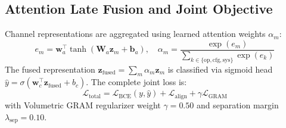 \documentclass[pdflatex,sn-mathphys-num]{sn-jnl}
\begin{document}
\subsection{Attention Late Fusion and Joint Objective}\label{sec:math_fusion}
Channel representations are aggregated using learned attention weights $\alpha_m$:
\begin{equation}
e_m = \mathbf{w}_a^\top \tanh\left(\mathbf{W}_a \mathbf{z}_m + \mathbf{b}_a\right), \quad \alpha_m = \frac{\exp(e_m)}{\sum_{k \in \{\text{op}, \text{cfg}, \text{sys}\}} \exp(e_k)}
\end{equation}
The fused representation $\mathbf{z}_{\text{fused}} = \sum_{m} \alpha_m \mathbf{z}_m$ is classified via sigmoid head $\hat{y} = \sigma(\mathbf{w}_c^\top \mathbf{z}_{\text{fused}} + b_c)$. The complete joint loss is:
\begin{equation}
\mathcal{L}_{\text{total}} = \mathcal{L}_{\text{BCE}}(y, \hat{y}) + \mathcal{L}_{\text{align}} + \gamma \mathcal{L}_{\text{GRAM}}
\end{equation}
with Volumetric GRAM regularizer weight $\gamma = 0.50$ and separation margin $\lambda_{\text{sep}} = 0.10$.
\end{document}
